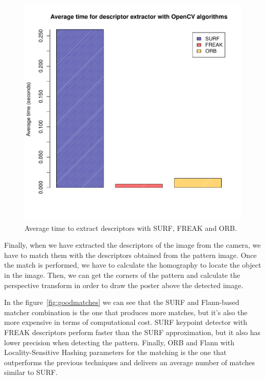 \begin{figure}
\centering
\includegraphics[scale=0.75]{performance/descriptors.pdf}
\caption{\label{fig:descriptors} Average time to extract descriptors with SURF,
  FREAK and ORB.}
\end{figure} 

Finally, when we have extracted the descriptors of the image from the camera, we
have to match them with the descriptors obtained from the pattern image. Once the
match is performed, we have to calculate the homography to locate the object in the
image. Then, we can get the corners of the pattern and calculate the perspective
transform in order to draw the poster above the detected image. 

In the figure~\ref{fig:goodmatches} we can see that the SURF and Flann-based matcher
combination is the one that produces more matches, but it's also the more expensive
in terms of computational cost. SURF keypoint detector with FREAK descriptors
perform faster than the SURF approximation, but it also has lower precision when
detecting the pattern. Finally, ORB and Flann with Locality-Sensitive Hashing
parameters for the matching is the one that outperforms the previous techniques and
delivers an average number of matches similar to SURF.

